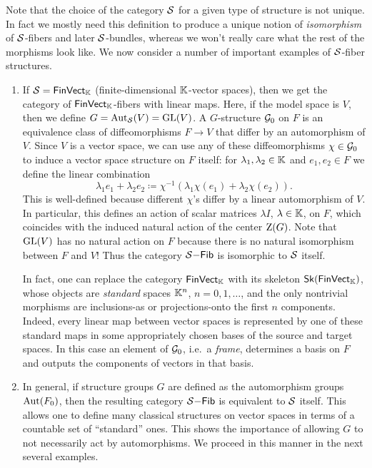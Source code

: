 Note that the choice of the category $\mathcal{S}$ for a given type of structure is not unique. In fact we mostly need this definition to produce a unique notion of \emph{isomorphism} of $\mathcal{S}$-fibers and later $\mathcal{S}$-bundles, whereas we won't really care what the rest of the morphisms look like. We now consider a number of important examples of $\mathcal{S}$-fiber structures.
\begin{example}\label{ex linear G-structures}
    \begin{enumerate}
        \item If $\mathcal{S}=\mathsf{FinVect}_{\mathbb{K}}$ (finite-dimensional $\mathbb{K}$-vector spaces), then we get the category of $\mathsf{FinVect}_{\mathbb{K}}$-fibers with linear maps. Here, if the model space is $V$, then we define $G=\operatorname{Aut}_{\mathcal{S}}(V)=\operatorname{GL}(V)$. A $G$-structure $\mathcal{G}_0$ on $F$ is an equivalence class of diffeomorphisms $F\to V$ that differ by an automorphism of $V$. Since $V$ is a vector space, we can use any of these diffeomorphisms $\chi\in\mathcal{G}_0$ to induce a vector space structure on $F$ itself: for $\lambda_1,\lambda_2\in\mathbb{K}$ and $e_1,e_2\in F$ we define the linear combination
        \[\lambda_1e_1+\lambda_2 e_2\coloneqq \chi^{-1}(\lambda_1\chi(e_1)+\lambda_2\chi(e_2)).\]
        This is well-defined because different $\chi$'s differ by a linear automorphism of $V$. In particular, this defines an action of scalar matrices $\lambda I$, $\lambda\in\mathbb{K}$, on $F$, which coincides with the induced natural action of the center $\mathrm{Z}(G)$. Note that $\operatorname{GL}(V)$ has no natural action on $F$ because there is no natural isomorphism between $F$ and $V$! Thus the category $\mathcal{S}\mathsf{-Fib}$ is isomorphic to $\mathcal{S}$ itself.

        In fact, one can replace the category $\mathsf{FinVect}_{\mathbb{K}}$ with its skeleton $\mathsf{Sk}(\mathsf{FinVect}_{\mathbb{K}})$, whose objects are \emph{standard} spaces $\mathbb{K}^n$, $n=0,1,\ldots$, and the only nontrivial morphisms are inclusions-as or projections-onto the first $n$ components. Indeed, every linear map between vector spaces is represented by one of these standard maps in some appropriately chosen bases of the source and target spaces. In this case an element of $\mathcal{G}_0$, i.e.\ a \emph{frame}, determines a basis on $F$ and outputs the components of vectors in that basis.
        
        \item In general, if structure groups $G$ are defined as the automorphism groups $\operatorname{Aut}(F_0)$, then the resulting category $\mathcal{S}\mathsf{-Fib}$ is equivalent to $\mathcal{S}$ itself. This allows one to define many classical structures on vector spaces in terms of a countable set of ``standard'' ones. This shows the importance of allowing $G$ to not necessarily act by automorphisms. We proceed in this manner in the next several examples.
        

\end{enumerate}
\end{example}
